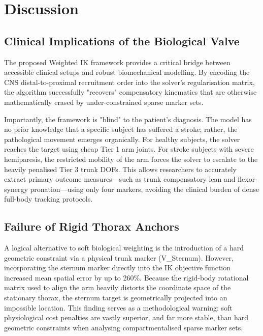 \documentclass[12pt, a4paper]{article}
\begin{document}
\section{Discussion}

\subsection{Clinical Implications of the Biological Valve}
The proposed Weighted IK framework provides a critical bridge between accessible clinical setups and robust biomechanical modelling. By encoding the CNS distal-to-proximal recruitment order into the solver's regularisation matrix, the algorithm successfully "recovers" compensatory kinematics that are otherwise mathematically erased by under-constrained sparse marker sets. 

Importantly, the framework is "blind" to the patient's diagnosis. The model has no prior knowledge that a specific subject has suffered a stroke; rather, the pathological movement emerges organically. For healthy subjects, the solver reaches the target using cheap Tier 1 arm joints. For stroke subjects with severe hemiparesis, the restricted mobility of the arm forces the solver to escalate to the heavily penalised Tier 3 trunk DOFs. This allows researchers to accurately extract primary outcome measures—such as trunk compensatory lean and flexor-synergy pronation—using only four markers, avoiding the clinical burden of dense full-body tracking protocols. 

\subsection{Failure of Rigid Thorax Anchors}
A logical alternative to soft biological weighting is the introduction of a hard geometric constraint via a physical trunk marker (V\_Sternum). However, incorporating the sternum marker directly into the IK objective function increased mean spatial error by up to 260\%. Because the rigid-body rotational matrix used to align the arm heavily distorts the coordinate space of the stationary thorax, the sternum target is geometrically projected into an impossible location. This finding serves as a methodological warning: soft physiological cost penalties are vastly superior, and far more stable, than hard geometric constraints when analysing compartmentalised sparse marker sets. 
\end{document}
